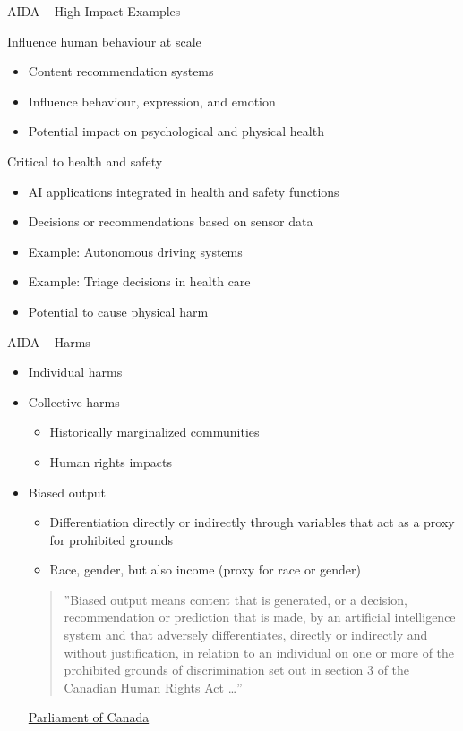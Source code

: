 \documentclass[ignorenonframetext,xcolor=x11names]{beamer}
\begin{document}
\begin{frame}{AIDA -- High Impact Examples}
  \begin{block}{Influence human behaviour at scale}
  \begin{itemize}
     \item Content recommendation systems
     \item Influence behaviour, expression, and emotion
     \item Potential impact on psychological and physical health
  \end{itemize}
  \end{block}
  
  \begin{block}{Critical to health and safety}
  \begin{itemize}
     \item AI applications integrated in health and safety functions
     \item Decisions or recommendations based on sensor data
     \item Example: Autonomous driving systems
     \item Example: Triage decisions in health care
     \item Potential to cause physical harm
  \end{itemize}
  \end{block}
\end{frame}

\begin{frame}{AIDA -- Harms}
\begin{itemize}
  \item Individual harms
  \item Collective harms 
  \begin{itemize}
     \item Historically marginalized communities
     \item Human rights impacts
  \end{itemize}
  \item Biased output
  \begin{itemize}
     \item Differentiation directly or indirectly through variables that act as a proxy for prohibited grounds
     \item Race, gender, but also income (proxy for race or gender)
  \end{itemize}
  
  \vspace{\baselineskip}
  \begin{quote}''Biased output means content that is generated, or a decision, recommendation or prediction that is made, by an artificial intelligence system and that adversely differentiates, directly or indirectly and without justification, in relation to an individual on one or more of the prohibited grounds of discrimination set out in section 3 of the Canadian Human Rights Act \ldots''\end{quote}  \scriptsize \href{https://www.parl.ca/legisinfo/en/bill/44-1/c-27}{Parliament of Canada}
\end{itemize}
\end{frame}
\end{document}
